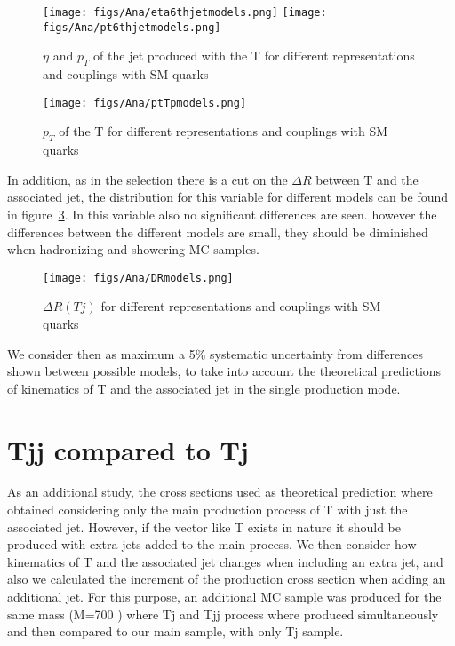 \begin{figure}[!hbtp]
  \begin{center}
    \texttt{[image: figs/Ana/eta6thjetmodels.png]}
    \texttt{[image: figs/Ana/pt6thjetmodels.png]}
    \caption{$\eta$ and $p_{T}$ of the jet produced with the T for different representations and couplings with SM quarks}
    \label{fig:accomjet}
  \end{center}
\end{figure}

\begin{figure}[!hbtp]
  \begin{center}
    \texttt{[image: figs/Ana/ptTpmodels.png]}
    \caption{$p_{T}$ of the T for different representations and couplings with SM quarks}
    \label{fig:Tppt}
  \end{center}
\end{figure}

In addition, as in the selection there is a cut on the $\Delta R$ between T and the associated jet, the distribution for this variable for different models can be found in figure~\ref{fig:DRmodels}. In this variable also no significant differences are seen. however the differences between the different models are small, they should be diminished when hadronizing and showering MC samples.

\begin{figure}[!hbtp]
  \begin{center}
    \texttt{[image: figs/Ana/DRmodels.png]}
    \caption{$\Delta R (Tj)$ for different representations and couplings with SM quarks}
    \label{fig:DRmodels}
  \end{center}
\end{figure}

We consider then as maximum a 5\% systematic uncertainty from differences shown between possible models, to take into account the theoretical predictions of kinematics of T and the associated jet in the single production mode.

\section{Tjj compared to Tj}

As an additional study, the cross sections used as theoretical prediction where obtained considering only the main production process of T with just the associated jet. However, if the vector like T exists in nature it should be produced with extra jets added to the main process. We then consider how kinematics of T and the associated jet changes when including an extra jet, and also we calculated the increment of the production cross section when adding an additional jet. For this purpose, an additional MC sample was produced for the same mass (M=700 \GeVcc) where Tj and Tjj process where produced simultaneously and then compared to our main sample, with only Tj sample.

